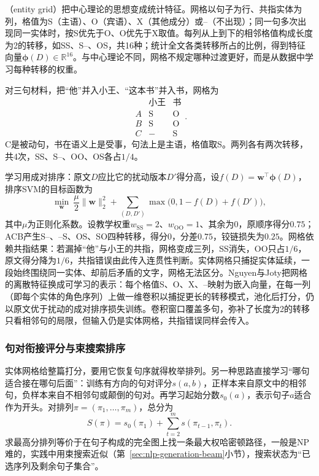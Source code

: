 （entity grid）把中心理论的思想变成统计特征。网格以句子为行、共指实体为列，格值为S（主语）、O（宾语）、X（其他成分）或--（不出现）；同一句多次出现同一实体时，按S优先于O、O优先于X取值。每列从上到下的相邻格值构成长度为2的转移，如SS、S--、OS，共16种；统计全文各类转移所占的比例，得到特征向量$\bm\phi(D)\in\mathbb R^{16}$。与中心理论不同，网格不规定哪种过渡更好，而是从数据中学习每种转移的权重。

对三句材料，把“他”并入小王、“这本书”并入书，网格为
\[
  \begin{array}{c|cc}
     & \text{小王} & \text{书}\\ \hline
   A & \mathrm S & \mathrm O\\
   B & \mathrm S & \mathrm O\\
   C & - & \mathrm S
  \end{array}.
\]
C是被动句，书在语义上是受事，句法上是主语，格值取S。两列各有两次转移，共4次，SS、S--、OO、OS各占$1/4$。

学习用成对排序：原文$D$应比它的扰动版本$D'$得分高，设$f(D)=\bm w^{\top}\bm\phi(D)$，排序SVM的目标函数为
\[
  \min_{\bm w}\ \frac{\mu}{2}\lVert\bm w\rVert_2^2+\sum_{(D,D')}\max\bigl(0,1-f(D)+f(D')\bigr),
\]
其中$\mu$为正则化系数。设教学权重$w_{\mathrm{SS}}=2$、$w_{\mathrm{OO}}=1$、其余为0，原顺序得分$0.75$；ACB产生S--、--S、OS、SO四种转移，得分0，分差$0.75$，铰链损失为$0.25$。网格依赖共指结果：若漏掉“他”与小王的共指，网格变成三列，SS消失，OO只占$1/6$，原文得分降为$1/6$，共指错误由此传入连贯性判断。实体网格只捕捉实体延续，一段始终围绕同一实体、却前后矛盾的文字，网格无法区分。Nguyen与Joty把网格的离散特征换成可学习的表示：每个格值S、O、X、--映射为嵌入向量，在每一列（即每个实体的角色序列）上做一维卷积以捕捉更长的转移模式，池化后打分，仍以原文优于扰动的成对排序损失训练。卷积窗口覆盖多句，弥补了长度为2的转移只看相邻句的局限，但输入仍是实体网格，共指错误同样会传入。

\subsubsection{句对衔接评分与束搜索排序}
\label{sec:nlp-analysis-pair-ordering}

实体网格给整篇打分，要用它恢复句序就得枚举排列。另一种思路直接学习“哪句适合接在哪句后面”：训练有方向的句对评分$s(a,b)$，正样本来自原文中的相邻句，负样本来自不相邻句或颠倒的句对。再学习起始分数$s_0(a)$，表示句子$a$适合作为开头。对排列$\pi=(\pi_1,\ldots,\pi_m)$，总分为
\[
  S(\pi)=s_0(\pi_1)+\sum_{t=2}^{m}s(\pi_{t-1},\pi_t).
\]
求最高分排列等价于在句子构成的完全图上找一条最大权哈密顿路径，一般是NP难的，实践中用束搜索近似（第~\ref{sec:nlp-generation-beam}小节），搜索状态为“已选序列及剩余句子集合”。

